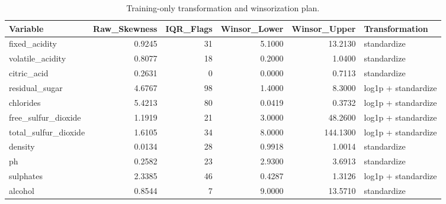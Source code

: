 \begin{table}

\caption{\label{tab:p2-transformation-plan}Training-only transformation and winsorization plan.}
\centering
\begin{tabular}[t]{lrrrrl}
\toprule
Variable & Raw\_Skewness & IQR\_Flags & Winsor\_Lower & Winsor\_Upper & Transformation\\
\midrule
fixed\_acidity & 0.9245 & 31 & 5.1000 & 13.2130 & standardize\\
volatile\_acidity & 0.8077 & 18 & 0.2000 & 1.0400 & standardize\\
citric\_acid & 0.2631 & 0 & 0.0000 & 0.7113 & standardize\\
residual\_sugar & 4.6767 & 98 & 1.4000 & 8.3000 & log1p + standardize\\
chlorides & 5.4213 & 80 & 0.0419 & 0.3732 & log1p + standardize\\
\addlinespace
free\_sulfur\_dioxide & 1.1919 & 21 & 3.0000 & 48.2600 & log1p + standardize\\
total\_sulfur\_dioxide & 1.6105 & 34 & 8.0000 & 144.1300 & log1p + standardize\\
density & 0.0134 & 28 & 0.9918 & 1.0014 & standardize\\
ph & 0.2582 & 23 & 2.9300 & 3.6913 & standardize\\
sulphates & 2.3385 & 46 & 0.4287 & 1.3126 & log1p + standardize\\
\addlinespace
alcohol & 0.8544 & 7 & 9.0000 & 13.5710 & standardize\\
\bottomrule
\end{tabular}
\end{table}
